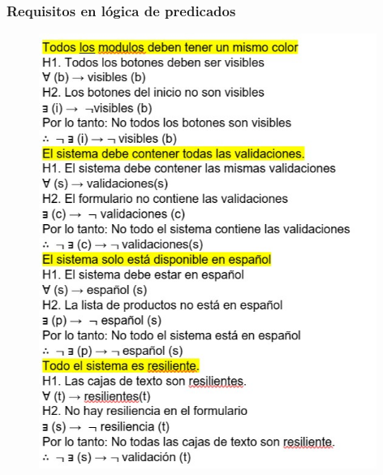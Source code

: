 \subsubsection{Requisitos en lógica de predicados}


\begin{figure}[htb]
\begin{center}
\includegraphics[width=11cm]{./imagenes/logica.jpg}
\end{center}

\end{figure}


